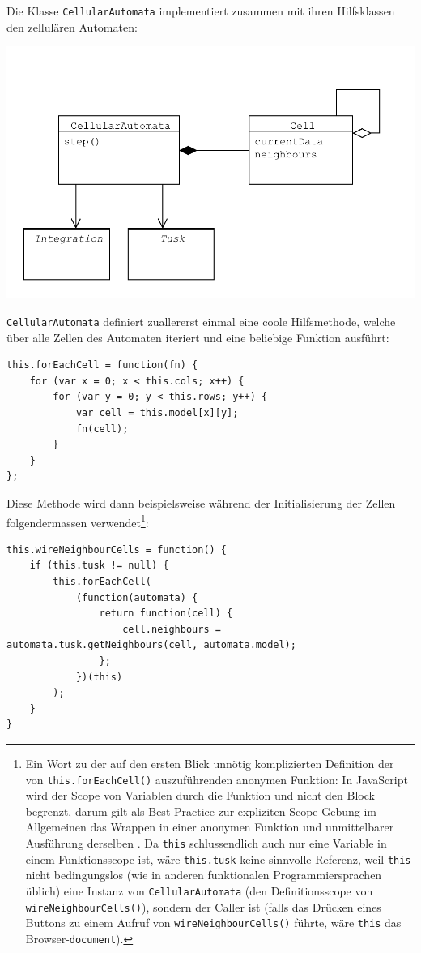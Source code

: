 \documentclass[11pt]{article} %
\theoremstyle{definition}
\begin{document}
Die Klasse {\tt CellularAutomata} implementiert zusammen mit ihren Hilfsklassen den zellulären Automaten:

\includegraphics[scale=0.7]{uml/Automata.pdf}

{\tt CellularAutomata} definiert zuallererst einmal eine coole Hilfsmethode, welche über alle Zellen des Automaten iteriert und eine beliebige Funktion ausführt:

\begin{lstlisting}
this.forEachCell = function(fn) {
	for (var x = 0; x < this.cols; x++) {
		for (var y = 0; y < this.rows; y++) {
			var cell = this.model[x][y];
			fn(cell);
		}
	}
};
\end{lstlisting}

Diese Methode wird dann beispielsweise während der Initialisierung der Zellen folgendermassen verwendet\footnote{Ein Wort zu der auf den ersten Blick unnötig komplizierten Definition der von {\tt this.forEachCell()} auszuführenden anonymen Funktion: In JavaScript wird der Scope von Variablen durch die Funktion und nicht den Block begrenzt, darum gilt als Best Practice zur expliziten Scope-Gebung im Allgemeinen das Wrappen in einer anonymen Funktion und unmittelbarer Ausführung derselben \cite{UnderstandingClosures}. Da {\tt this} schlussendlich auch nur eine Variable in einem Funktionsscope ist, wäre {\tt this.tusk} keine sinnvolle Referenz, weil {\tt this} nicht bedingungslos (wie in anderen funktionalen Programmiersprachen üblich) eine Instanz von {\tt CellularAutomata} (den Definitionsscope von {\tt wireNeighbourCells()}), sondern der Caller ist (falls das Drücken eines Buttons zu einem Aufruf von {\tt wireNeighbourCells()} führte, wäre {\tt this} das Browser-{\tt document}).}:
\begin{lstlisting}
this.wireNeighbourCells = function() {
	if (this.tusk != null) {
		this.forEachCell(
			(function(automata) {
				return function(cell) {
					cell.neighbours = automata.tusk.getNeighbours(cell, automata.model);
				};
			})(this)
		);
	}
}
\end{lstlisting}
\end{document}

